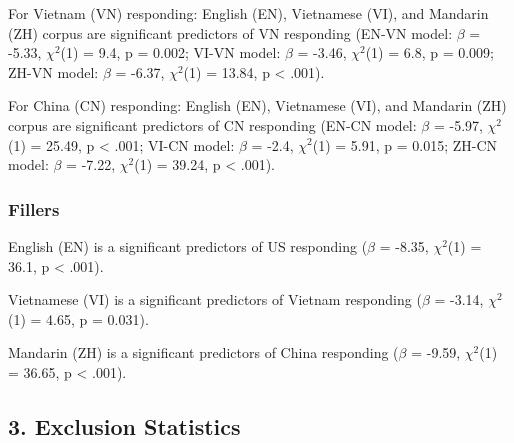 \documentclass[10pt, letterpaper]{article}
\begin{document}
For Vietnam (VN) responding: English (EN), Vietnamese (VI), and Mandarin
(ZH) corpus are significant predictors of VN responding (EN-VN model:
\(\beta\) = -5.33, \(\chi^2\)(1) = 9.4, p = 0.002; VI-VN model:
\(\beta\) = -3.46, \(\chi^2\)(1) = 6.8, p = 0.009; ZH-VN model:
\(\beta\) = -6.37, \(\chi^2\)(1) = 13.84, p \textless{} .001).

For China (CN) responding: English (EN), Vietnamese (VI), and Mandarin
(ZH) corpus are significant predictors of CN responding (EN-CN model:
\(\beta\) = -5.97, \(\chi^2\)(1) = 25.49, p \textless{} .001; VI-CN
model: \(\beta\) = -2.4, \(\chi^2\)(1) = 5.91, p = 0.015; ZH-CN model:
\(\beta\) = -7.22, \(\chi^2\)(1) = 39.24, p \textless{} .001).

\hypertarget{fillers}{%
\subsubsection{Fillers}\label{fillers}}

English (EN) is a significant predictors of US responding (\(\beta\) =
-8.35, \(\chi^2\)(1) = 36.1, p \textless{} .001).

Vietnamese (VI) is a significant predictors of Vietnam responding
(\(\beta\) = -3.14, \(\chi^2\)(1) = 4.65, p = 0.031).

Mandarin (ZH) is a significant predictors of China responding (\(\beta\)
= -9.59, \(\chi^2\)(1) = 36.65, p \textless{} .001).

\hypertarget{exclusion-statistics}{%
\subsection{3. Exclusion Statistics}\label{exclusion-statistics}}
\end{document}
